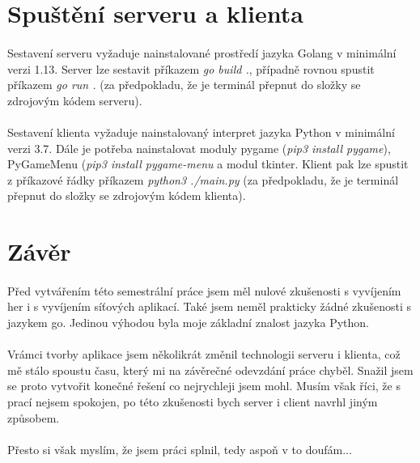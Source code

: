 \documentclass[12pt, a4paper]{article}
\begin{document}
\newpage
\section{Spuštění serveru a klienta}
\paragraph{}
Sestavení serveru vyžaduje nainstalované prostředí jazyka Golang v minimální verzi 1.13. Server lze sestavit příkazem
\textit{go build .}, případně rovnou spustit příkazem \textit{go run .} (za předpokladu, že je terminál přepnut do
složky se zdrojovým kódem serveru).

\paragraph{}
Sestavení klienta vyžaduje nainstalovaný interpret jazyka Python v minimální verzi 3.7. Dále je potřeba nainstalovat
moduly pygame (\textit{pip3 install pygame}), PyGameMenu (\textit{pip3 install pygame-menu} a modul tkinter. Klient
pak lze spustit z příkazové řádky příkazem \textit{python3 ./main.py}  (za předpokladu, že je terminál přepnut do
složky se zdrojovým kódem klienta).

\newpage
\section{Závěr}
\paragraph{}
Před vytvářením této semestrální práce jsem měl nulové zkušenosti s vyvíjením her i s vyvíjením síťových aplikací.
Také jsem neměl prakticky žádné zkušenosti s jazykem go. Jedinou výhodou byla moje základní znalost jazyka Python.

\paragraph{}
Vrámci tvorby aplikace jsem několikrát změnil technologii serveru i klienta, což mě stálo spoustu času, který mi na
závěrečné odevzdání práce chyběl. Snažil jsem se proto vytvořit konečné řešení co nejrychleji jsem mohl. Musím však
říci, že s prací nejsem spokojen, po této zkušenosti bych server i client navrhl jiným způsobem.

\paragraph{}
Přesto si však myslím, že jsem práci splnil, tedy aspoň v to doufám...

\paragraph{}

\newpage
\listoftables
\end{document}
